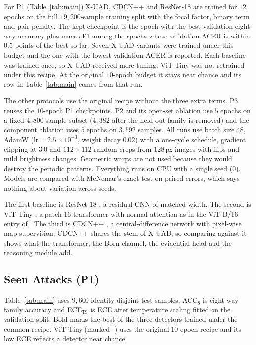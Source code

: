 \documentclass[conference]{IEEEtran}
\newcommand{\sub}[1]{\subsection{\texorpdfstring{\textbf{#1}}{#1}}}
\begin{document}
For P1 (Table~\ref{tab:main}) X-UAD, CDCN++ and ResNet-18 are trained for $12$ epochs
on the full $19{,}200$-sample training split with the focal factor, binary term and
pair penalty. The kept checkpoint is the epoch with the best validation eight-way
accuracy plus macro-F1 among the epochs whose validation ACER is within $0.5$ points
of the best so far. Seven X-UAD variants were trained under this budget and the one
with the lowest validation ACER is reported. Each baseline was trained once, so X-UAD
received more tuning. ViT-Tiny was not retrained under this recipe. At the original
$10$-epoch budget it stays near chance and its row in Table~\ref{tab:main} comes from
that run.

The other protocols use the original recipe without the three extra terms. P3 reuses
the $10$-epoch P1 checkpoints. P2 and its open-set ablation use $5$ epochs on a fixed
$4{,}800$-sample subset ($4{,}382$ after the held-out family is removed) and the
component ablation uses $5$ epochs on $3{,}592$ samples. All runs use batch size $48$,
AdamW ($\text{lr}=2.5\times10^{-3}$, weight decay $0.02$) with a one-cycle schedule,
gradient clipping at $3.0$ and $112\times112$ random crops from $128$\,px images with
flips and mild brightness changes. Geometric warps are not used because they would
destroy the periodic patterns. Everything runs on CPU with a single seed (0). Models
are compared with McNemar's exact test on paired errors, which says nothing about
variation across seeds.

The first baseline is ResNet-18 \cite{he2016resnet}, a residual CNN of matched
width. The second is ViT-Tiny \cite{dosovitskiy2021vit}, a patch-16 transformer with
normal attention as in the ViT-B/16 entry of \cite{yu2024unified}. The third is CDCN++
\cite{yu2020cdcn,yu2021revisiting}, a central-difference network with pixel-wise map
supervision. CDCN++ shares the stem of X-UAD, so comparing against it shows what the
transformer, the Born channel, the evidential head and the reasoning module add.

\sub{Seen Attacks (P1)}

\begin{table}[t]
\centering
\caption{Results on P1}
\label{tab:main}
\scriptsize

\end{table}

Table~\ref{tab:main} uses $9{,}600$ identity-disjoint test samples. ACC$_8$ is
eight-way family accuracy and ECE$_{\text{TS}}$ is ECE after temperature scaling
fitted on the validation split. Bold marks the best of the three detectors trained
under the common recipe. ViT-Tiny (marked $^{\dagger}$) uses the original $10$-epoch
recipe and its low ECE reflects a detector near chance.
\end{document}
